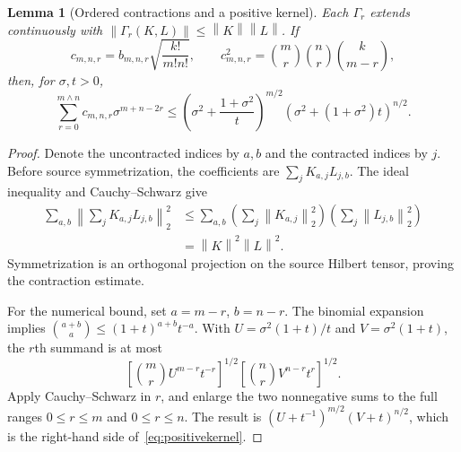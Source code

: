 \documentclass[11pt,a4paper]{amsart}
\numberwithin{equation}{section}
\newtheorem{lemma}[theorem]{Lemma}
\theoremstyle{definition}
\theoremstyle{remark}
\newcommand{\norm}[1]{\left\lVert#1\right\rVert}
\begin{document}
\begin{lemma}[Ordered contractions and a positive kernel]\label{lem:positivekernel}
Each $\Gamma_r$ extends continuously with
$\norm{\Gamma_r(K,L)}\le\norm K\norm L$.
If
\[
 c_{m,n,r}=b_{m,n,r}\sqrt{\frac{k!}{m!n!}},
 \qquad c_{m,n,r}^2=\binom mr\binom nr\binom{k}{m-r},
\]
then, for $\sigma,t>0$,
\begin{equation}\label{eq:positivekernel}
 \sum_{r=0}^{m\wedge n}c_{m,n,r}\sigma^{m+n-2r}
 \le\left(\sigma^2+\frac{1+\sigma^2}{t}\right)^{m/2}
     \left(\sigma^2+(1+\sigma^2)t\right)^{n/2}.
\end{equation}
\end{lemma}
\begin{proof}
Denote the uncontracted indices by $a,b$ and the contracted indices by $j$. Before source symmetrization, the coefficients are $\sum_jK_{a,j}L_{j,b}$. The ideal inequality and Cauchy--Schwarz give
\[
 \begin{split}
 \sum_{a,b}\left\|\sum_jK_{a,j}L_{j,b}\right\|_2^2
 &\le\sum_{a,b}\left(\sum_j\norm{K_{a,j}}_2^2\right)
                     \left(\sum_j\norm{L_{j,b}}_2^2\right)\\
 &=\norm K^2\norm L^2.
 \end{split}
\]
Symmetrization is an orthogonal projection on the source Hilbert tensor, proving the contraction estimate.

For the numerical bound, set $a=m-r$, $b=n-r$. The binomial expansion implies
$\binom{a+b}a\le(1+t)^{a+b}t^{-a}$.
With $U=\sigma^2(1+t)/t$ and $V=\sigma^2(1+t)$, the $r$th summand is at most
\[
 \left[\binom mrU^{m-r}t^{-r}\right]^{1/2}
 \left[\binom nrV^{n-r}t^r\right]^{1/2}.
\]
Apply Cauchy--Schwarz in $r$, and enlarge the two nonnegative sums to the full ranges $0\le r\le m$ and $0\le r\le n$. The result is
$(U+t^{-1})^{m/2}(V+t)^{n/2}$, which is the right-hand side of~\eqref{eq:positivekernel}.
\end{proof}
\end{document}
